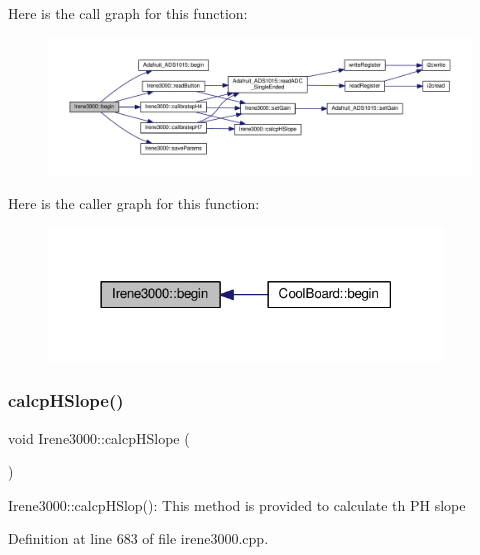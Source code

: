 Here is the call graph for this function\+:\nopagebreak
\begin{figure}[H]
\begin{center}
\leavevmode
\includegraphics[width=350pt]{d6/d03/class_irene3000_ad5891806c500ae1007afe52b9e304c2b_cgraph}
\end{center}
\end{figure}
Here is the caller graph for this function\+:\nopagebreak
\begin{figure}[H]
\begin{center}
\leavevmode
\includegraphics[width=297pt]{d6/d03/class_irene3000_ad5891806c500ae1007afe52b9e304c2b_icgraph}
\end{center}
\end{figure}
\mbox{\label{class_irene3000_a81f6a79e546679692053f7ac1af49613}} 
\subsubsection{\texorpdfstring{calcp\+H\+Slope()}{calcpHSlope()}}
{\footnotesize\ttfamily void Irene3000\+::calcp\+H\+Slope (\begin{DoxyParamCaption}{ }\end{DoxyParamCaption})}

Irene3000\+::calcp\+H\+Slop()\+: This method is provided to calculate th PH slope 

Definition at line 683 of file irene3000.\+cpp.


